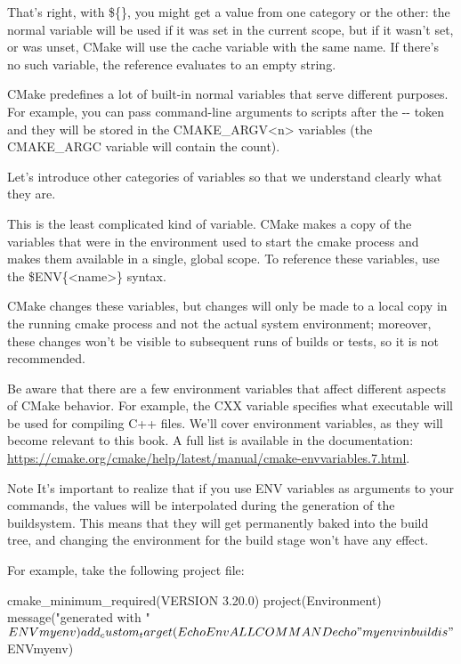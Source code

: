 That’s right, with \$\{\}, you might get a value from one category or the other: the normal variable will be used if it was set in the current scope, but if it wasn’t set, or was unset, CMake will use the cache variable with the same name. If there’s no such variable, the reference evaluates to an empty string.

CMake predefines a lot of built-in normal variables that serve different purposes. For example, you can pass command-line arguments to scripts after the -{}- token and they will be stored in the CMAKE\_ARGV<n> variables (the CMAKE\_ARGC variable will contain the count).

Let’s introduce other categories of variables so that we understand clearly what they are.


This is the least complicated kind of variable. CMake makes a copy of the variables that were in the environment used to start the cmake process and makes them available in a single, global scope. To reference these variables, use the \$ENV\{<name>\} syntax.

CMake changes these variables, but changes will only be made to a local copy in the running cmake process and not the actual system environment; moreover, these changes won’t be visible to subsequent runs of builds or tests, so it is not recommended.

Be aware that there are a few environment variables that affect different aspects of CMake behavior. For example, the CXX variable specifies what executable will be used for compiling C++ files. We’ll cover environment variables, as they will become relevant to this book. A full list is available in the documentation: \url{https://cmake.org/cmake/help/latest/manual/cmake-envvariables.7.html}.

\begin{myNotic}{Note}
It’s important to realize that if you use ENV variables as arguments to your commands, the values will be interpolated during the generation of the buildsystem. This means that they will get permanently baked into the build tree, and changing the environment for the build stage won’t have any effect.
\end{myNotic}

For example, take the following project file:


\begin{cmake}
cmake_minimum_required(VERSION 3.20.0)
project(Environment)
message("generated with " $ENV{myenv})
add_custom_target(EchoEnv ALL COMMAND echo "myenv in build
  is" $ENV{myenv})
\end{cmake}

